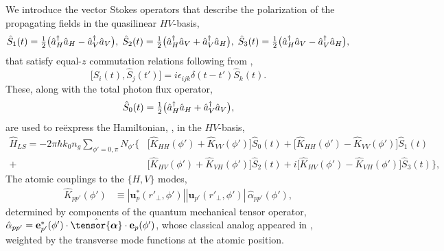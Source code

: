 \documentclass[preprint, aps,pra,onecolumn]{revtex4-1} %
\newcommand{\poltens}{\hat{\tensor{\boldsymbol{\alpha}}}}
\newcommand{\polcomp}{\hat{K}} %
\begin{document}
We introduce the vector Stokes operators that describe the polarization of the propagating fields in the quasilinear $HV$-basis,
	\begin{align} \label{Eq::StokesComponents}
		\hat{S}_1(t) = \mbox{$\frac{1}{2}$}\big( \hat{a}^\dag_H \hat{a}_H-\hat{a}^\dag_V \hat{a}_V \big), \; \hat{S}_2(t) = \mbox{$\frac{1}{2}$}\big( \hat{a}^\dag_H \hat{a}_V+\hat{a}^\dag_V \hat{a}_H \big), \; \hat{S}_3(t) = \mbox{$\frac{1}{2}$}\big( \hat{a}^\dag_H \hat{a}_V-\hat{a}^\dag_V \hat{a}_H \big),
	\end{align}
that satisfy equal-$z$ commutation relations following from ,
	\begin{equation} \label{Eq::StokesCommutation}
		\big[\hat{S}_i(t), \hat{S}_j(t')\big] =i \epsilon_{ijk} \delta(t-t')  \hat{S}_k(t).
	\end{equation}
These, along with the total photon flux operator,
	\begin{equation}
		\hat{S}_0(t) = \mbox{$\frac{1}{2}$}\big( \hat{a}^\dag_H \hat{a}_H+\hat{a}^\dag_V \hat{a}_V \big),
	\end{equation}
are used to re\"{e}xpress the Hamiltonian, , in the $HV$-basis,
	\begin{align}  
		\hat{H}_{LS} 	= - 2 \pi \hbar k_0 n_g \sum_{\phi'=0,\pi}N_{\phi'} \Big\{ &\big[ \polcomp_{HH}(\phi')+\polcomp_{VV}(\phi') \big] \hat{S}_0(t) +  \big[\polcomp_{HH}(\phi')  - \polcomp_{VV}(\phi')  \big] \hat{S}_1(t) \nonumber \\
+ &\big[\polcomp_{HV}(\phi') + \polcomp_{VH}(\phi')  \big] \hat{S}_2(t) + i  \big[ \polcomp_{HV}(\phi')-\polcomp_{VH}(\phi') \big]\hat{S}_3(t) \Big\}, \label{Eq::GenHamiltonian} 
	\end{align}
The atomic couplings to the $\{H,V\}$ modes,
	\begin{align} 
		\polcomp_{p p'}(\phi') & \equiv |\mathbf{u}^*_p(r'_\perp, \phi')||\mathbf{u}_{p'}(r'_\perp, \phi')| \, \hat{\alpha}_{p p'}(\phi') , 
	\end{align}
determined by components of the quantum mechanical tensor operator, $\hat{\alpha}_{p p'} = \mathbf{e}^*_{p'}(\phi') \cdot \poltens \cdot \mathbf{e}_{p}(\phi') $, whose classical analog appeared in , weighted by the transverse mode functions at the atomic position.
\end{document}
